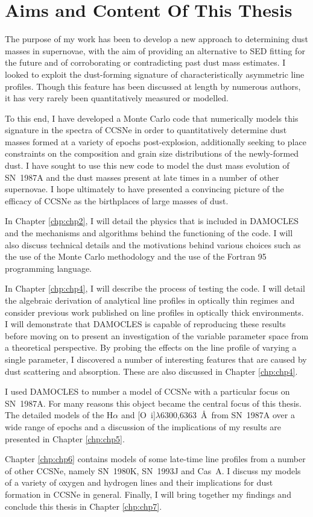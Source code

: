 \section{Aims and Content Of This Thesis}
The purpose of my work has been to develop a new approach to determining dust masses in supernovae, with the aim of providing an alternative to SED fitting for the future and of corroborating or contradicting past dust mass estimates.  I looked to exploit the dust-forming signature of characteristically asymmetric line profiles.  Though this feature has been discussed at length by numerous authors, it has very rarely been quantitatively measured or modelled.

To this end, I have developed a Monte Carlo  code that numerically models this signature in the spectra of CCSNe in order to quantitatively determine dust masses formed at a variety of epochs post-explosion, additionally seeking to place constraints on the composition and grain size distributions of the newly-formed dust. I have sought to use this new code to model the dust mass evolution  of SN~1987A and the dust masses present at late times in a number of other supernovae.  I hope ultimately to have presented a convincing picture of the efficacy of CCSNe as the birthplaces of large masses of dust.

In Chapter \ref{chp:chp2}, I will detail the physics that is included in DAMOCLES and the mechanisms and algorithms behind the functioning of the code.  I will also discuss technical details and the motivations behind various choices such as the use of the Monte Carlo methodology and the use of the Fortran 95 programming language.  

In Chapter \ref{chp:chp4}, I will describe the process of testing the code.  I will detail the algebraic derivation of analytical line profiles in optically thin regimes and consider previous work published on line profiles in optically thick environments.  I will demonstrate that DAMOCLES is capable of reproducing these results before moving on to present an investigation of the variable parameter space from a theoretical perspective.  By probing the effects on the line profile of varying a single parameter, I discovered a number of interesting features that are caused by dust scattering and absorption.  These are also discussed in Chapter \ref{chp:chp4}.  

I used DAMOCLES to number a model of CCSNe with a particular focus on SN~1987A.  For many reasons this object became the central focus of this thesis. The detailed models of the H$\alpha$ and [O~{\sc i}]$\lambda$6300,6363~\AA\ from SN~1987A over a wide range of epochs and a discussion of the implications of my results are presented in Chapter \ref{chp:chp5}.  

Chapter \ref{chp:chp6} contains models of some late-time line profiles from a number of other CCSNe, namely SN~1980K, SN~1993J and Cas~A.  I discuss my models of a variety of oxygen and hydrogen lines and their implications for dust formation in CCSNe in general.  Finally, I will bring together my findings and conclude this thesis in Chapter \ref{chp:chp7}.

